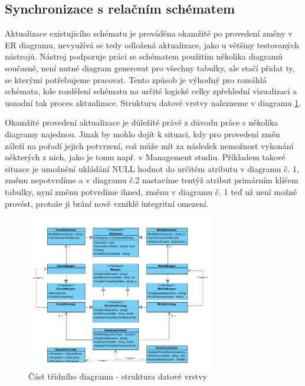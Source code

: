 \documentclass[czech,bachelor,public,dept460,male,oneside]{diploma}
\begin{document}
	\subsection{Synchronizace s relačním schématem}
	Aktualizace existujícího schématu je prováděna okamžitě po provedení změny v ER diagramu, nevyužívá se tedy odložená aktualizace, jako u většiny testovaných nástrojů. Nástroj podporuje práci se schématem použitím několika diagramů současně, není nutné diagram generovat pro všechny tabulky, ale stačí přidat ty, se kterými potřebujeme pracovat. Tento způsob je výhodný pro rozsáhlá schémata, kde rozdělení schématu na určité logické celky zpřehlední vizualizaci a usnadní tak proces aktualizace. Strukturu datové vrstvy nalezneme v diagramu \ref{fig:classDiagSync}.
	
	Okamžité provedení aktualizace je důležité právě z důvodu práce s několika diagramy najednou. Jinak by mohlo dojít k situaci, kdy pro provedení změn záleží na pořadí jejich potvrzení, což může mít za následek nemožnost vykonání některých z nich, jako je tomu např. v Management studiu. Příkladem takové situace je umožnění ukládání NULL hodnot do určitém atributu v diagramu č. 1, změnu nepotvrdíme a v diagramu č.2 nastavíme tentýž atribut primárním klíčem tabulky, nyní změnu potvrdíme ihned, změnu v diagramu č. 1 teď už není možné provést, protože ji brání nově vzniklé integritní omezení.
	
	\begin{figure}[!h]
		\centering
		\includegraphics[width=0.74\textwidth]{Figures/EditorSync}
		\caption{Část třídního diagramu - struktura datové vrstvy}
		\label{fig:classDiagSync}
	\end{figure}
	
\end{document}
